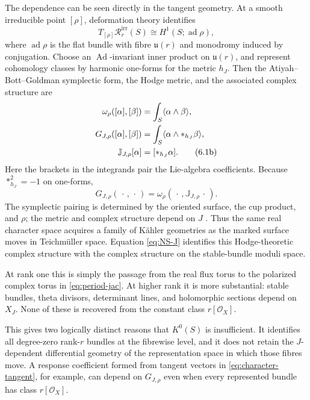 \documentclass[11pt]{article}
\theoremstyle{definition}
\theoremstyle{remark}
\newcommand{\cR}{\mathcal R}
\newcommand{\cO}{\mathcal O}
\begin{document}
The dependence can be seen directly in the tangent geometry.  At a smooth
irreducible point \([\rho]\), deformation theory identifies
\[
       T_{[\rho]}\cR_r^{\mathrm{irr}}(S)
          \cong H^1(S;\operatorname{ad}\rho),
       \tag{6.1a}\label{eq:character-tangent}
\]
where \(\operatorname{ad}\rho\) is the flat bundle with fibre
\(\mathfrak u(r)\) and monodromy induced by conjugation.  Choose an
\(\operatorname{Ad}\)-invariant inner product on \(\mathfrak u(r)\), and
represent cohomology classes by harmonic one-forms for the metric \(h_J\).
Then the Atiyah--Bott--Goldman symplectic form, the Hodge metric, and the
associated complex structure are
\begin{align}
 \omega_\rho([\alpha],[\beta])
    &=\int_S\langle\alpha\wedge\beta\rangle,\notag\\
 G_{J,\rho}([\alpha],[\beta])
    &=\int_S\langle\alpha\wedge *_{h_J}\beta\rangle,\notag\\
 \mathbb J_{J,\rho}[\alpha]
    &=[*_{h_J}\alpha].
 \tag{6.1b}\label{eq:nonabelian-kahler-data}
\end{align}
Here the brackets in the integrands pair the Lie-algebra coefficients.
Because \(*_{h_J}^2=-1\) on one-forms,
\[
        G_{J,\rho}(\,\cdot\,,\,\cdot\,)
          =\omega_\rho(\,\cdot\,,\mathbb J_{J,\rho}\,\cdot\,).
        \tag{6.1c}\label{eq:nonabelian-kahler-relation}
\]
The symplectic pairing is determined by the oriented surface, the cup
product, and \(\rho\); the metric and complex structure depend on \(J\)
\cite{AtiyahBott,GoldmanSymplectic}.  Thus the same real character space
acquires a family of K\"ahler geometries as the marked surface moves in
Teichm\"uller space.  Equation \eqref{eq:NS-J} identifies this Hodge-theoretic
complex structure with the complex structure on the stable-bundle moduli
space.

At rank one this is simply the passage from the real flux torus to the
polarized complex torus in \eqref{eq:period-jac}.  At higher rank it is more
substantial: stable bundles, theta divisors, determinant lines, and
holomorphic sections depend on \(X_J\).  None of these is recovered from the
constant class \(r[\cO_X]\).

This gives two logically distinct reasons that \(K^0(S)\) is insufficient.
It identifies all degree-zero rank-\(r\) bundles at the fibrewise level, and
it does not retain the \(J\)-dependent differential geometry of the
representation space in which those fibres move.  A response coefficient
formed from tangent vectors in \eqref{eq:character-tangent}, for example,
can depend on \(G_{J,\rho}\) even when every represented bundle has class
\(r[\cO_X]\).
\end{document}
